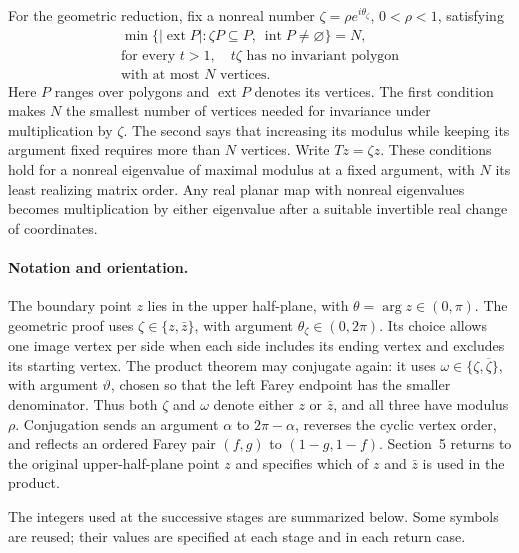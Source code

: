 \documentclass[11pt,a4paper]{article}
\DeclareMathOperator{\ext}{ext}
\theoremstyle{definition}
\theoremstyle{remark}
\numberwithin{equation}{section}
\begin{document}
For the geometric reduction, fix a nonreal number $\zeta=\rho e^{i\theta_\zeta}$, $0<\rho<1$, satisfying
\begin{equation}\label{eq:extremal}
 \begin{gathered}
 \min\{|\ext P|:\zeta P\subseteq P,\ \operatorname{int}P\ne\varnothing\}=N,\\
 \text{for every }t>1,\quad t\zeta\text{ has no invariant polygon}\\
 \text{with at most }N\text{ vertices}.
 \end{gathered}
\end{equation}
Here $P$ ranges over polygons and $\ext P$ denotes its vertices. The first condition makes $N$ the smallest number of vertices needed for invariance under multiplication by $\zeta$. The second says that increasing its modulus while keeping its argument fixed requires more than $N$ vertices. Write $Tz=\zeta z$. These conditions hold for a nonreal eigenvalue of maximal modulus at a fixed argument, with $N$ its least realizing matrix order. Any real planar map with nonreal eigenvalues becomes multiplication by either eigenvalue after a suitable invertible real change of coordinates.

\paragraph{Notation and orientation.}
The boundary point $z$ lies in the upper half-plane, with $\theta=\arg z\in(0,\pi)$. The geometric proof uses $\zeta\in\{z,\bar z\}$, with argument $\theta_\zeta\in(0,2\pi)$. Its choice allows one image vertex per side when each side includes its ending vertex and excludes its starting vertex. The product theorem may conjugate again: it uses $\omega\in\{\zeta,\overline\zeta\}$, with argument $\vartheta$, chosen so that the left Farey endpoint has the smaller denominator. Thus both $\zeta$ and $\omega$ denote either $z$ or $\bar z$, and all three have modulus $\rho$. Conjugation sends an argument $\alpha$ to $2\pi-\alpha$, reverses the cyclic vertex order, and reflects an ordered Farey pair $(f,g)$ to $(1-g,1-f)$. Section~5 returns to the original upper-half-plane point $z$ and specifies which of $z$ and $\bar z$ is used in the product.

The integers used at the successive stages are summarized below. Some symbols are reused; their values are specified at each stage and in each return case.
\end{document}

